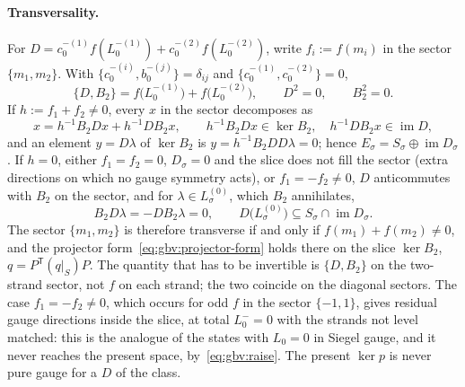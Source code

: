 \paragraph{Transversality.}
For $D = c_0^{-(1)} f(L_0^{-(1)}) + c_0^{-(2)} f(L_0^{-(2)})$, write $f_i := f(m_i)$ in the sector $\{ m_1, m_2 \}$.
With $\{ c_0^{-(i)}, b_0^{-(j)} \} = \delta_{ij}$ and $\{ c_0^{-(1)}, c_0^{-(2)} \} = 0$,
\begin{equation}
  \label{eq:gbv:anticommutator}
  \{ D, B_2 \}
    = f\big( L_0^{-(1)} \big) + f\big( L_0^{-(2)} \big),
  \qquad
  D^2
    = 0,
  \qquad
  B_2^2
    = 0.
\end{equation}
If $h := f_1 + f_2 \neq 0$, every $x$ in the sector decomposes as
\begin{equation}
  \label{eq:gbv:hodge}
  x
    = h^{-1} B_2 D x + h^{-1} D B_2 x,
  \qquad
  h^{-1} B_2 D x
    \in \ker B_2,
  \quad
  h^{-1} D B_2 x
    \in \operatorname{im} D,
\end{equation}
and an element $y = D \lambda$ of $\ker B_2$ is $y = h^{-1} B_2 D D \lambda = 0$; hence $E_\sigma = S_\sigma \oplus \operatorname{im} D_\sigma$.
If $h = 0$, either $f_1 = f_2 = 0$, $D_\sigma = 0$ and the slice does not fill the sector (extra directions on which no gauge symmetry acts), or $f_1 = - f_2 \neq 0$, $D$ anticommutes with $B_2$ on the sector, and for $\lambda \in L^{(0)}_\sigma$, which $B_2$ annihilates,
\begin{equation}
  \label{eq:gbv:residual-gauge}
  B_2 D \lambda
    = - D B_2 \lambda
    = 0,
  \qquad
  D \big( L^{(0)}_\sigma \big)
    \subseteq S_\sigma \cap \operatorname{im} D_\sigma.
\end{equation}
The sector $\{ m_1, m_2 \}$ is therefore transverse if and only if $f(m_1) + f(m_2) \neq 0$, and the projector form~\eqref{eq:gbv:projector-form} holds there on the slice $\ker B_2$, $q = P^{\mathsf T} (q|_S) P$.
The quantity that has to be invertible is $\{ D, B_2 \}$ on the two-strand sector, not $f$ on each strand; the two coincide on the diagonal sectors.
The case $f_1 = - f_2 \neq 0$, which occurs for odd $f$ in the sector $\{ -1, 1 \}$, gives residual gauge directions inside the slice, at total $L_0^- = 0$ with the strands not level matched: this is the analogue of the states with $L_0 = 0$ in Siegel gauge, and it never reaches the present space, by~\eqref{eq:gbv:raise}.
The present $\ker p$ is never pure gauge for a $D$ of the class.

